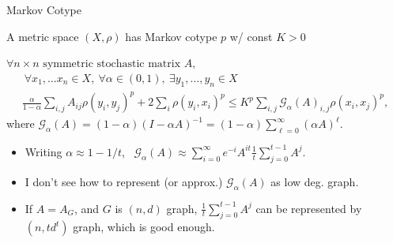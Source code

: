 \documentclass[compress]{beamer}
\begin{document}
\begin{frame}{Markov Cotype}

\onslide<+->
\begin{definition}
A metric space $(X,\rho)$ has Markov cotype $p$ w/ const $K>0$ 

 $\forall n\times n \text{ symmetric stochastic matrix }A,$
 \vskip -0.2in
\begin{multline*}
\  \forall x_1,\ldots x_n\in X, \ \forall \alpha\in (0,1),\ \exists y_1,\ldots, y_n\in X \\
 \frac{\alpha}{1-\alpha} \sum_{i,j} A_{ij}\rho(y_i,y_j)^p+ 2\sum_i\rho(y_i,x_i)^p \le K^p\sum_{i,j}
 \mathcal G_\alpha(A)_{i,j} \rho(x_i,x_j)^p, 
 \end{multline*}
 \vskip -0.2in
 where  $\mathcal G_\alpha(A)=(1-\alpha)(I-\alpha A)^{-1}=(1-\alpha) \sum_{\ell=0}^\infty (\alpha A)^\ell $.
\end{definition}

\begin{overprint}
\begin{itemize}

\item<4-> Writing $\alpha\approx 1 -1/t$, \ 
\( \mathcal G_\alpha(A)\approx \sum_{i={0}}^\infty e^{-i} A^{it} \frac{1}{t} \sum_{j=0}^{t-1} A^j .\)

\item<5-> I don't see how to represent (or approx.) $\mathcal G_\alpha(A)$ as low deg. graph.


\item<6->  If $A=A_G$, and $G$ is $(n,d)$ graph,  $\frac{1}{t} \sum_{j=0}^{t-1} A^j $ can be represented by
$(n,td^t)$ graph, which is good enough. 
\end{itemize}
\end{overprint}
\end{frame}
\end{document}
